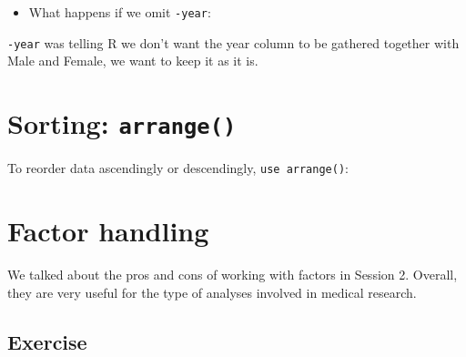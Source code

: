 \documentclass[]{book}
\makeatletter
\newenvironment{Shaded}{\begin{snugshade}}{\end{snugshade}}
\newcommand{\KeywordTok}[1]{\textcolor[rgb]{0.13,0.29,0.53}{\textbf{#1}}}
\newcommand{\DataTypeTok}[1]{\textcolor[rgb]{0.13,0.29,0.53}{#1}}
\newcommand{\StringTok}[1]{\textcolor[rgb]{0.31,0.60,0.02}{#1}}
\newcommand{\CommentTok}[1]{\textcolor[rgb]{0.56,0.35,0.01}{\textit{#1}}}
\newcommand{\OperatorTok}[1]{\textcolor[rgb]{0.81,0.36,0.00}{\textbf{#1}}}
\newcommand{\NormalTok}[1]{#1}
\providecommand{\tightlist}{%
  \setlength{\itemsep}{0pt}\setlength{\parskip}{0pt}}
\newenvironment{kframe}{%
\medskip{}
\setlength{\fboxsep}{.8em}
 \def\at@end@of@kframe{}%
 \ifinner\ifhmode%
  \def\at@end@of@kframe{\end{minipage}}%
  \begin{minipage}{\columnwidth}%
 \fi\fi%
 \def\FrameCommand##1{\hskip\@totalleftmargin \hskip-\fboxsep
 \colorbox{shadecolor}{##1}\hskip-\fboxsep
     \hskip-\linewidth \hskip-\@totalleftmargin \hskip\columnwidth}%
 \MakeFramed {\advance\hsize-\width
   \@totalleftmargin\z@ \linewidth\hsize
   \@setminipage}}%
 {\par\unskip\endMakeFramed%
 \at@end@of@kframe}
\renewenvironment{Shaded}{\begin{kframe}}{\end{kframe}}
\makeatother
\begin{document}
\begin{itemize}
\tightlist
\item
  What happens if we omit \texttt{-year}:
\end{itemize}

\begin{Shaded}
\end{Shaded}

\texttt{-year} was telling R we don't want the year column to be
gathered together with Male and Female, we want to keep it as it is.

\section{\texorpdfstring{Sorting:
\texttt{arrange()}}{Sorting: arrange()}}\label{sorting-arrange}

To reorder data ascendingly or descendingly, \texttt{use\ arrange()}:

\begin{Shaded}
\end{Shaded}

\newpage 

\section{Factor handling}\label{factor-handling}

We talked about the pros and cons of working with factors in Session 2.
Overall, they are very useful for the type of analyses involved in
medical research.

\subsection{Exercise}\label{exercise-21}
\end{document}
